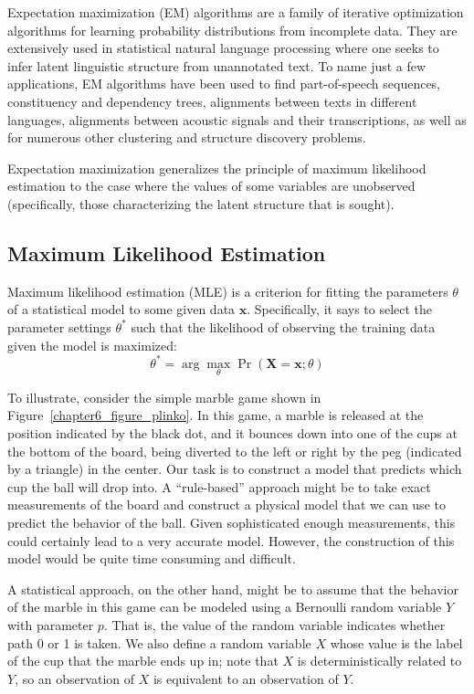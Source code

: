 Expectation maximization (EM) algorithms
\cite{Dempster_Laird_Rubin_1977} are a family of iterative
optimization algorithms for learning probability distributions from
incomplete data.  They are extensively used in statistical natural
language processing where one seeks to infer latent linguistic
structure from unannotated text.  To name just a few applications, EM
algorithms have been used to find part-of-speech sequences,
constituency and dependency trees, alignments between texts in
different languages, alignments between acoustic signals and their
transcriptions, as well as for numerous other clustering and structure
discovery problems.

Expectation maximization generalizes the principle of maximum
likelihood estimation to the case where the values of some variables
are unobserved (specifically, those characterizing the latent
structure that is sought).

\subsection{Maximum Likelihood Estimation}

Maximum likelihood estimation (MLE) is a criterion for fitting the
parameters $\theta$ of a statistical model to some given data
$\textbf{x}$.  Specifically, it says to select the parameter settings
$\theta^*$ such that the likelihood of observing the training data
given the model is maximized:
\begin{equation}
\theta^* = \arg \max_{\theta} \Pr(\textbf{X}=\textbf{x};\theta)
\end{equation}

To illustrate, consider the simple marble game shown in
Figure~\ref{chapter6_figure_plinko}.  In this game, a marble is
released at the position indicated by the black dot, and it bounces
down into one of the cups at the bottom of the board, being diverted
to the left or right by the peg (indicated by a triangle) in the
center.  Our task is to construct a model that predicts which cup the
ball will drop into.  A ``rule-based'' approach might be to take exact
measurements of the board and construct a physical model that we can
use to predict the behavior of the ball.  Given sophisticated enough
measurements, this could certainly lead to a very accurate model.
However, the construction of this model would be quite time consuming
and difficult.

A statistical approach, on the other hand, might be to assume that the
behavior of the marble in this game can be modeled using a Bernoulli
random variable $Y$ with parameter $p$.  That is, the value of the
random variable indicates whether path 0 or 1 is taken.  We also
define a random variable $X$ whose value is the label of the cup that
the marble ends up in; note that $X$ is deterministically related to
$Y$, so an observation of $X$ is equivalent to an observation of $Y$.

